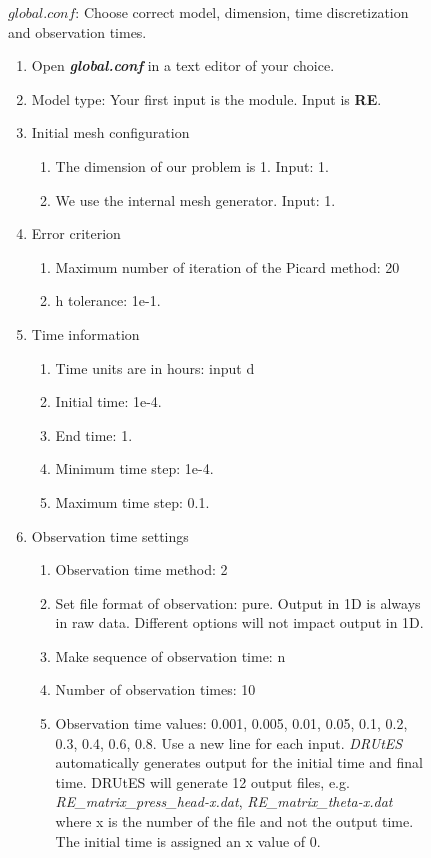 \documentclass[
10pt, %
a4paper, %
oneside, %
headinclude,footinclude, %
BCOR5mm, %
]{scrartcl}
\begin{document}
\begin{figure}[!h]
$global.conf$: Choose correct model, dimension, time discretization and observation times.
\begin{enumerate}
\item Open \textbf{\emph{global.conf}} in a text editor of your choice. 
\item Model type: Your first input is the module. Input is \textbf{RE}.
\item Initial mesh configuration \begin{enumerate}
\item The dimension of our problem is 1. Input: 1.
\item We use the internal mesh generator. Input: 1. 
\end{enumerate}
\item Error criterion \begin{enumerate} 
\item Maximum number of iteration of the Picard method: 20 
\item h tolerance: 1e-1.
\end{enumerate}
\item Time information 
\begin{enumerate} 
\item Time units are in hours: input d
\item Initial time: 1e-4.
\item End time: 1.
\item Minimum time step: 1e-4.
\item Maximum time step: 0.1.
\end{enumerate}
\item Observation time settings \begin{enumerate}
\item Observation time method: 2
\item Set file format of observation: pure. Output in 1D is always in raw data. Different options will not impact output in 1D.
\item Make sequence of observation time: n
\item Number of observation times: 10
\item Observation time values: 0.001,
0.005,
0.01,
0.05,
0.1,
0.2,
0.3,
0.4,
0.6,
0.8. Use a new line for each input. \textit{DRUtES} automatically generates output for the initial time and final time. DRUtES will generate 12 output files, e.g. \textit{RE\_matrix\_press\_head-x.dat}, \textit{RE\_matrix\_theta-x.dat} where x is the number of the file and not the output time. The initial time is assigned an x value of 0. 

\end{enumerate}
\end{enumerate}
\end{figure}
\end{document}
